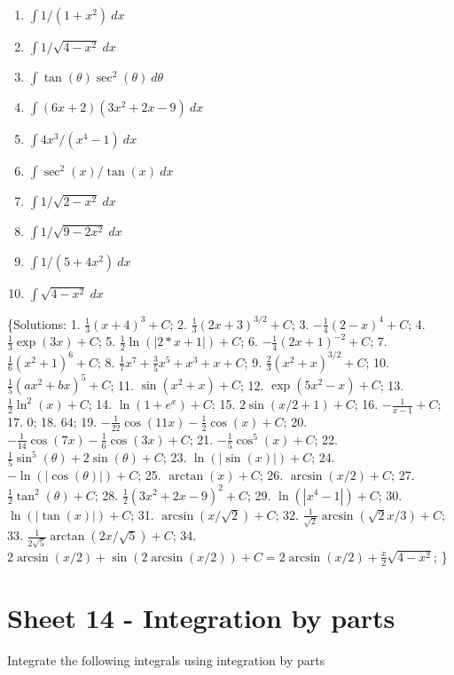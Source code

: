\documentclass[
  11pt,
  oneside]{book}
\newcommand{\slide}{}
\theoremstyle{definition}
\theoremstyle{definition}
\theoremstyle{definition}
\theoremstyle{definition}
\theoremstyle{remark}
\begin{document}
\begin{enumerate}
\item
  \(\int 1/(1+x^2)\ dx\)
\item
  \(\int 1/\sqrt{4-x^2}\ dx\)
\item
  \(\int \tan(\theta)\sec^2(\theta)\ d\theta\)
\item
  \(\int (6x+2)(3x^2+2x-9)\ dx\)
\item
  \(\int 4x^3/(x^4-1)\ dx\)
\item
  \(\int \sec^2(x)/\tan(x)\ dx\)
\item
  \(\int 1/\sqrt{2-x^2}\ dx\)
\item
  \(\int 1/\sqrt{9-2x^2}\ dx\)
\item
  \(\int 1/(5+4x^2)\ dx\)
\item
  \(\int \sqrt{4-x^2}\ dx\)
\end{enumerate}

\{Solutions:
1. \(\frac{1}{3}(x+4)^3+C\);
2. \(\frac{1}{3}(2x+3)^{3/2}+C\);
3. \(-\frac{1}{4}(2-x)^4 +C\);
4. \(\frac{1}{3}\exp(3x)+C\);
5. \(\frac{1}{2}\ln(|2*x+1|)+C\);
6. \(-\frac{1}{4}(2x+1)^{-2}+C\);
7. \(\frac{1}{6}(x^2+1)^6+C\);
8. \(\frac{1}{7}x^7+\frac{3}{5}x^5+x^3+x+C\);
9. \(\frac{2}{3}(x^2+x)^{3/2}+C\);
10. \(\frac{1}{5}(ax^2+bx)^{5}+C\);
11. \(\sin(x^2+x)+C\);
12. \(\exp(5x^2-x)+C\);
13. \(\frac{1}{2}\ln^2(x)+C\);
14. \(\ln(1+e^x)+C\);
15. \(2\sin(x/2+1)+C\);
16. \(-\frac{1}{x-1}+C\);
17. \(0\);
18. \(64\);
19. \(-\frac{1}{22}\cos(11x)-\frac{1}{2}\cos(x)+C\);
20. \(-\frac{1}{14}\cos(7x)-\frac{1}{6}\cos(3x)+C\);
21. \(-\frac{1}{5}\cos^5(x)+C\);
22. \(\frac{1}{5}\sin^5(\theta)+2\sin(\theta)+C\);
23. \(\ln(|\sin(x)|)+C\);
24. \(-\ln(|\cos(\theta)|)+C\);
25. \(\arctan(x)+C\);
26. \(\arcsin(x/2)+C\);
27. \(\frac{1}{2}\tan^2(\theta)+C\);
28. \(\frac{1}{2}(3x^2+2x-9)^2+C\);
29. \(\ln(|x^4-1|)+C\);
30. \(\ln(|\tan(x)|)+C\);
31. \(\arcsin(x/\sqrt{2})+C\);
32. \(\frac{1}{\sqrt{2}}\arcsin(\sqrt{2}x/3) +C\);
33. \(\frac{1}{2\sqrt{5}}\arctan(2x/\sqrt{5}) +C\);
34. \(2\arcsin(x/2) + \sin\left(2\arcsin(x/2)\right) +C = 2\arcsin(x/2)+\frac{x}{2}\sqrt{4-x^2}\);
\}

\slide

\section{Sheet 14 - Integration by parts}\label{sheet-14---integration-by-parts}

Integrate the following integrals using integration by parts
\end{document}
